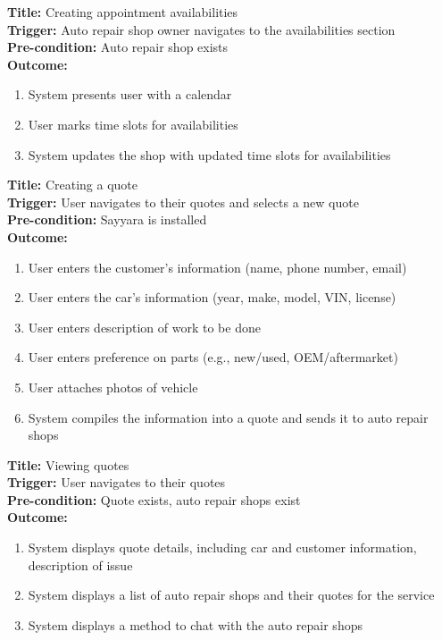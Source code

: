 \documentclass[12pt]{article}
\begin{document}
\textbf{Title:} Creating appointment availabilities\\
\textbf{Trigger:} Auto repair shop owner navigates to the availabilities section\\
\textbf{Pre-condition:} Auto repair shop exists\\
\textbf{Outcome:}
\begin{enumerate}
	\item System presents user with a calendar
	\item User marks time slots for availabilities
	\item System updates the shop with updated time slots for availabilities
\end{enumerate}

\textbf{Title:} Creating a quote\\
\textbf{Trigger:} User navigates to their quotes and selects a new quote\\
\textbf{Pre-condition:} Sayyara is installed\\
\textbf{Outcome:}
\begin{enumerate}
	\item User enters the customer's information (name, phone number, email)
	\item User enters the car's information (year, make, model, VIN, license)
	\item User enters description of work to be done
	\item User enters preference on parts (e.g., new/used, OEM/aftermarket)
	\item User attaches photos of vehicle
	\item System compiles the information into a quote and sends it to auto repair shops
\end{enumerate}

\textbf{Title:} Viewing quotes\\
\textbf{Trigger:} User navigates to their quotes\\
\textbf{Pre-condition:} Quote exists, auto repair shops exist\\
\textbf{Outcome:}
\begin{enumerate}
	\item System displays quote details, including car and customer information, description of issue
	\item System displays a list of auto repair shops and their quotes for the service
	\item System displays a method to chat with the auto repair shops
\end{enumerate}
\end{document}
